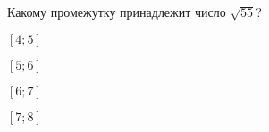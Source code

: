 \begin{ex}
	\begin{condition}
		Какому промежутку принадлежит число $\sqrt{55}$?
		
		\selectanswer
		\begin{enumcols}[columns=4]
			\item $[4;5]$
			\item $[5;6]$
			\item $[6;7]$
			\item $[7;8]$
		\end{enumcols}
	\end{condition}
\end{ex}